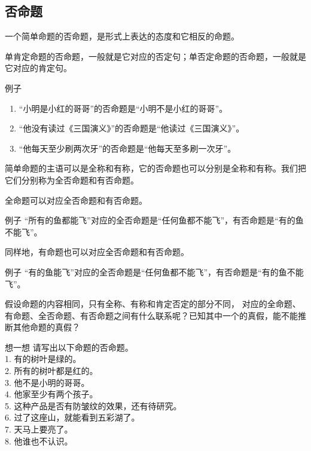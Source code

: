 \documentclass[12pt,UTF8,a4paper]{article}
\begin{document}
\subsection{否命题}

一个简单命题的否命题，是形式上表达的态度和它相反的命题。

单肯定命题的否命题，一般就是它对应的否定句；单否定命题的否命题，一般就是它对应的肯定句。

\begin{blockin}{例子}
    \begin{enumerate}
        \item “小明是小红的哥哥”的否命题是“小明不是小红的哥哥”。
        \item “他没有读过《三国演义》”的否命题是“他读过《三国演义》”。
        \item “他每天至少刷两次牙”的否命题是“他每天至多刷一次牙”。
    \end{enumerate}
\end{blockin}

简单命题的主语可以是全称和有称，它的否命题也可以分别是全称和有称。我们把它们分别称为全否命题和有否命题。

全命题可以对应全否命题和有否命题。

\begin{blockin}{例子}
    “所有的鱼都能飞”对应的全否命题是“任何鱼都不能飞”，有否命题是“有的鱼不能飞”。
\end{blockin}

同样地，有命题也可以对应全否命题和有否命题。

\begin{blockin}{例子}
    “有的鱼能飞”对应的全否命题是“任何鱼都不能飞”，有否命题是“有的鱼不能飞”。
\end{blockin}

假设命题的内容相同，只有全称、有称和肯定否定的部分不同，
对应的全命题、有命题、全否命题、有否命题之间有什么联系呢？已知其中一个的真假，能不能推断其他命题的真假？

\begin{blockaft}{想一想}
    请写出以下命题的否命题。\\
    1. 有的树叶是绿的。 \\
    2. 所有的树叶都是红的。\\
    3. 他不是小明的哥哥。\\
    4. 他家至少有两个孩子。 \\
    5. 这种产品是否有防皱纹的效果，还有待研究。\\
    6. 过了这座山，就能看到五彩湖了。\\
    7. 天马上要亮了。 \\
    8. 他谁也不认识。
\end{blockaft}
\end{document}
